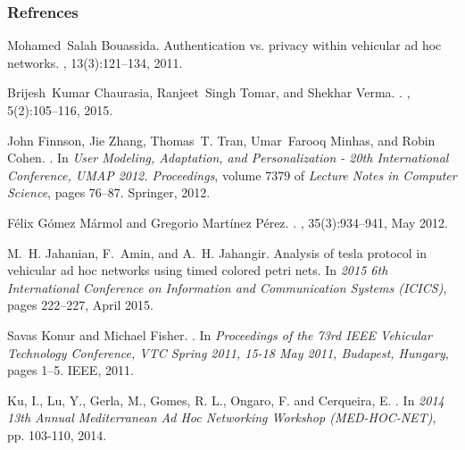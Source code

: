 \documentclass{beamer}
\begin{document}
\begin{frame}[allowframebreaks]
\label{biblio}
\frametitle{Refrences}
\smallskip



\begin{thebibliography}{10}
Mohamed~Salah Bouassida.
\newblock Authentication vs. privacy within vehicular ad hoc networks.
, 13(3):121--134,
  2011.

Brijesh~Kumar Chaurasia, Ranjeet~Singh Tomar, and Shekhar Verma.
.
, 5(2):105--116, 2015.

John Finnson, Jie Zhang, Thomas~T. Tran, Umar~Farooq Minhas, and Robin Cohen.
.
\newblock In {\em {User Modeling, Adaptation, and Personalization - 20th
  International Conference, {UMAP} 2012.
  Proceedings}}, volume 7379 of {\em {Lecture Notes in Computer Science}},
  pages 76--87. Springer, 2012.

F{\'e}lix {G{\'o}mez M{\'a}rmol} and Gregorio {Mart{\'i}nez P{\'e}rez}.
.
, 35(3):934--941, May 2012.

M.~H. Jahanian, F.~Amin, and A.~H. Jahangir.
\newblock Analysis of tesla protocol in vehicular ad hoc networks using timed
  colored petri nets.
\newblock In {\em 2015 6th International Conference on Information and
  Communication Systems (ICICS)}, pages 222--227, April 2015.

Savas Konur and Michael Fisher.
.
\newblock In {\em {Proceedings of the 73rd {IEEE} Vehicular Technology
  Conference, {VTC} Spring 2011, 15-18 May 2011, Budapest, Hungary}}, pages
  1--5. {IEEE}, 2011.



Ku, I., Lu, Y., Gerla, M., Gomes,  R. L., Ongaro, F. and Cerqueira, E.
.
\newblock In \textit{2014 13th Annual Mediterranean Ad Hoc Networking Workshop (MED-HOC-NET)}, pp. 103-110,  2014.


\end{thebibliography}
\end{frame}
\end{document}
